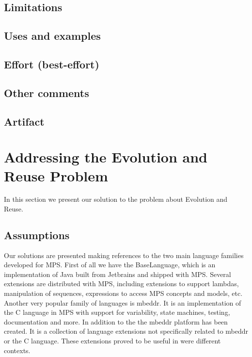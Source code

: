\documentclass[preprint,numbers,10pt]{sigplanconf}
\begin{document}
\subsection{Limitations}

\subsection{Uses and examples}

\subsection{Effort (best-effort)}

\subsection{Other comments}

\subsection{Artifact}

%
%

\section{Addressing the Evolution and Reuse Problem}

In this section we present our solution to the problem about Evolution and Reuse.

\subsection{Assumptions}

Our solutions are presented making references to the two main language families developed for MPS.
First of all we have the BaseLanguage, which is an implementation of Java built from Jetbrains and shipped with MPS. Several extensions are distributed with MPS, including extensions to support lambdas, manipulation of sequences, expressions to access MPS concepts and models, etc.
Another very popular family of languages is mbeddr. It is an implementation of the C language in MPS with support for variability, state machines, testing, documentation and more. In addition to the the mbeddr platform has been created. It is a collection of language extensions not specifically related to mbeddr or the C language. These extensions proved to be useful in were different contexts.
\end{document}
